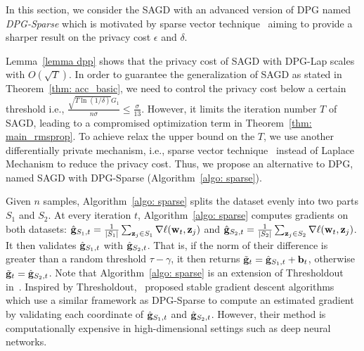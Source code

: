\documentclass[11pt]{article}
\begin{document}
In this section, we consider the SAGD with an advanced version of DPG named \emph{DPG-Sparse} which is motivated by sparse vector technique~\citep{dwro2014} aiming to provide a sharper result on the privacy cost $\epsilon$ and $\delta$.

Lemma~\ref{lemma dpp} shows that the privacy cost of SAGD with DPG-Lap scales with $O(\sqrt{T})$. In order to guarantee the generalization of SAGD as stated in Theorem~\ref{thm: acc_basic}, we need to control the privacy cost below a certain threshold i.e., $\frac{\sqrt{T \ln(1/\delta)} G_1}{n\sigma} \leq \frac{\sigma}{13}$. However, it limits the iteration number $T$ of SAGD, leading to a compromised optimization term in Theorem~\ref{thm: main_rmsprop}.  To achieve relax the upper bound on the $T$, we use another differentially private
mechanism, i.e., sparse vector technique~\citep{dwfe15,dwfe2015b,dwfe2015c,dwro2014} instead of Laplace Mechanism to reduce the privacy cost. Thus, we propose an alternative to DPG, named SAGD with DPG-Sparse (Algorithm~\ref{algo: sparse}).


Given $n$ samples, Algorithm~\ref{algo: sparse} splits the dataset evenly into two parts $S_1$ and $S_2$. At every iteration $t$, Algorithm~\ref{algo: sparse}  computes gradients on both datasets:
$\hat {\mathbf{g}}_{S_1,t} = \frac{1}{|S_1|} \sum_{\mathbf{z}_j \in S_1}\nabla \ell(\mathbf{w}_t, \mathbf{z}_j)$ and $\hat {\mathbf{g}}_{S_2,t} = \frac{1}{|S_2|} \sum_{\mathbf{z}_j \in S_2}\nabla \ell(\mathbf{w}_t, \mathbf{z}_j)$.
It then validates $\hat {\mathbf{g}}_{S_1,t} $ with $\hat {\mathbf{g}}_{S_2,t}$. That is, if the norm of their difference is greater than a random threshold $\tau-\gamma$, it then returns $\tilde {\mathbf{g}}_t = \hat {\mathbf{g}}_{S_1,t} + \mathbf{b}_t$, otherwise $\tilde {\mathbf{g}}_t = \hat {\mathbf{g}}_{S_2,t}$. 
Note that Algorithm~\ref{algo: sparse} is an extension of Thresholdout in~\citet{zhch2018}.
Inspired by Thresholdout,~\citet{zhch2018} proposed stable gradient descent algorithms which use a similar framework as DPG-Sparse to compute an estimated gradient by validating each coordinate of $\hat {\mathbf{g}}_{S_1,t}$ and $\hat {\mathbf{g}}_{S_2,t}$. However, their  method is computationally expensive in high-dimensional settings such as deep neural networks. 

\end{document}
